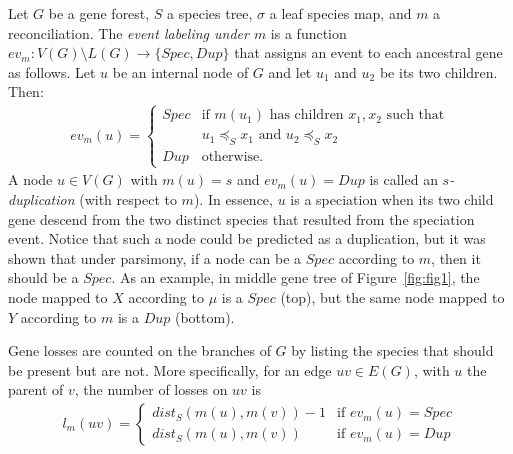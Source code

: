 \documentclass[10pt]{article}
\begin{document}
Let $G$ be a gene forest, $S$ a species tree, $\sigma$ a leaf species map, and $m$ a reconciliation.  The \emph{event labeling under $m$} is a function $ev_m : V(G) \setminus L(G) \rightarrow \{Spec, Dup\}$ that assigns an event to each ancestral gene as follows.
Let $u$ be an internal node of $G$ and let $u_1$ and $u_2$ be its two children. 
Then:
\begin{align*}
    ev_m(u) = \begin{cases}
        Spec & \mbox{if $m(u_1)$ has children $x_1, x_2$ such that} \\
        & \mbox{$u_1 \preceq_S x_1$ and $u_2 \preceq_S x_2$}\\
        Dup &\mbox{otherwise.}
    \end{cases}
\end{align*}
A node $u \in V(G)$ with $m(u) = s$ and $ev_m(u) = Dup$ is called an \emph{$s$-duplication} (with respect to $m$).
In essence, $u$ is a speciation when its two child gene descend from the two distinct species that resulted from the speciation event.  Notice that such a node could be predicted as a duplication, but it was shown that under parsimony, if a node can be a $Spec$ according to $m$, then it should be a $Spec$.  As an example, in middle gene tree of Figure~\ref{fig:fig1}, the node mapped to $X$ according to $\mu$ is a $Spec$ (top), but the same node mapped to $Y$ according to $m$ is a $Dup$ (bottom).

Gene losses are counted on the branches of $G$ by listing the species that should be present but are not.  More specifically, for an edge $uv \in E(G)$, with $u$ the parent of $v$, the number of losses on $uv$ is 
\begin{align*}
    l_m(uv) = \begin{cases}
        dist_S(m(u), m(v)) - 1 &\mbox{if $ev_m(u) = Spec$} \\
        dist_S(m(u), m(v)) &\mbox{if $ev_m(u) = Dup$}
    \end{cases}
\end{align*}

\end{document}
